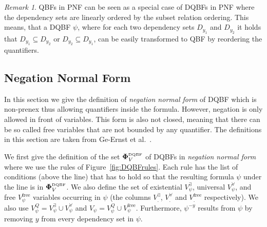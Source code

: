 \documentclass[
  digital, %
  color,
  twoside, %
  table,   %
  nolof,     %
  nolot,     %
]{fithesis3}
\theoremstyle{definition}
\theoremstyle{remark}
\newtheorem*{remark}{Remark}
\newcommand{\DQBF}[1]{\mathbf{\Phi}_{#1}^{\normalfont{\text{\tiny DQBF}}}}
\newcommand{\evars}[1]{V_{#1}^{\exists}}
\newcommand{\uvars}[1]{V_{#1}^{\forall}}
\newcommand{\fvars}[1]{V_{#1}^{\mathrm{free}}}
\newcommand{\qvars}[1]{V_{#1}^{Q}}
\begin{document}
\begin{remark}
QBFs in PNF can be seen as a special case of DQBFs in PNF where the dependency sets are linearly ordered by the subset relation ordering. This means, that a DQBF $\psi$, where for each two dependency sets $D_{y_1}$ and $D_{y_2}$ it holds that $D_{y_1} \subseteq D_{y_2}$ or $D_{y_2} \subseteq D_{y_1}$, can be easily transformed to QBF by reordering the quantifiers.
\end{remark}

\subsection{Negation Normal Form}
In this section we give the definition of \emph{negation normal form} of DQBF which is non-prenex thus allowing quantifiers inside the formula. However, negation is only allowed in front of variables. %
This form is also not closed, meaning that there can be so called free variables that are not bounded by any quantifier. The definitions in this section are taken from Ge-Ernst et al.~\cite{HQSquantifierLocalisation}.


We first give the definition of the set $\DQBF{V}$ of DQBFs in \emph{negation normal form} where we use the rules of Figure~\ref{fig:DQBFrules}. Each rule has the list of conditions (above the line) that has to hold so that the resulting formula $\psi$ under the line is in $\DQBF{V}$. We also define the set of existential $\evars{\psi}$, universal $\uvars{\psi}$, and free $\fvars{\psi}$ variables occurring in $\psi$ (the columns $\evars{.}$, $\uvars{.}$ and $\fvars{.}$ respectively). We also use $\qvars{\psi} = \evars{\psi} \cup \uvars{\psi}$ and $V_{\psi} = \qvars{\psi} \cup \fvars{\psi}$.  Furthermore, $\psi^{-y}$ results from $\psi$ by removing $y$ from every dependency set in $\psi$. 
\end{document}
